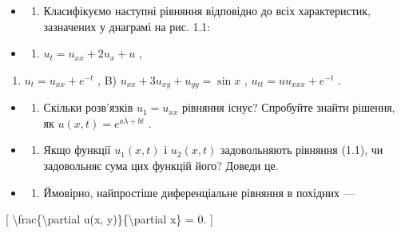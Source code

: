 \documentclass[
]{article}
\providecommand{\tightlist}{%
  \setlength{\itemsep}{0pt}\setlength{\parskip}{0pt}}
\begin{document}
\begin{itemize}
\tightlist
\item
  \begin{enumerate}
  \def\labelenumi{\arabic{enumi}.}
  \tightlist
  \item
    Класифікуємо наступні рівняння відповідно до всіх характеристик,
    зазначених у днаграмі на рис. 1.1:
  \end{enumerate}
\item
  \begin{enumerate}
  \def\labelenumi{\alph{enumi})}
  \tightlist
  \item
    \(u_t = u_{xx} + 2u_x + u\) ,
  \end{enumerate}
\end{itemize}

\begin{enumerate}
\def\labelenumi{\arabic{enumi})}
\setcounter{enumi}{5}
\tightlist
\item
  \(u_t = u_{xx} + e^{-t}\) , B) \(u_{xx} + 3u_{xy} + u_{yy} = \sin x\)
  , \(u_{tt} = uu_{xxx} + e^{-t}\) .
\end{enumerate}

\begin{itemize}
\tightlist
\item
  \begin{enumerate}
  \def\labelenumi{\arabic{enumi}.}
  \setcounter{enumi}{1}
  \tightlist
  \item
    Скільки розв'язків \(u_1 = u_{xx}\) рівняння існує? Спробуйте знайти
    рішення, як \(u(x, t) = e^{a\lambda + bt}\) .
  \end{enumerate}
\item
  \begin{enumerate}
  \def\labelenumi{\arabic{enumi}.}
  \setcounter{enumi}{2}
  \tightlist
  \item
    Якщо функції \(u_1(x, t)\) і \(u_2(x, t)\) задовольняють рівняння
    (1.1), чи задовольняє сума цих функцій його? Доведи це.
  \end{enumerate}
\item
  \begin{enumerate}
  \def\labelenumi{\arabic{enumi}.}
  \setcounter{enumi}{3}
  \tightlist
  \item
    Ймовірно, найпростіше диференціальне рівняння в похідних ---
  \end{enumerate}
\end{itemize}

{[} \textbackslash frac\{\textbackslash partial u(x,
y)\}\{\textbackslash partial x\} = 0. {]}
\end{document}
